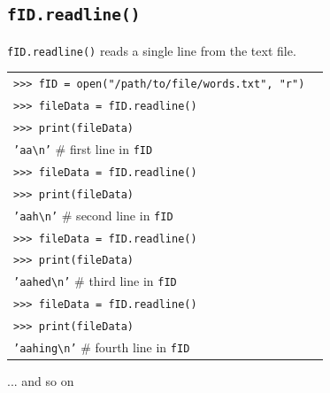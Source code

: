 \documentclass[t,handout,9pt]{beamer}
\begin{document}
\subsection{\texttt{fID.readline()}}
\begin{frame}
\vfill
\texttt{fID.readline()} reads a single line from the text file.
\begin{table}[]
\begin{flushleft}
\begin{tabular}{ll}
\texttt{>{}>{}> fID = open("/path/to/file/words.txt", "r")} &  \\
\texttt{>{}>{}> fileData = fID.readline()} &  \\
\texttt{>{}>{}> print(fileData)} &  \\
\texttt{'aa\textbackslash n'} \hfill \# first line in \texttt{fID} &\\
\texttt{>{}>{}> fileData = fID.readline()} &  \\
\texttt{>{}>{}> print(fileData)} &  \\
\texttt{'aah\textbackslash n'} \hfill \# second line in \texttt{fID} &\\
\texttt{>{}>{}> fileData = fID.readline()} &  \\
\texttt{>{}>{}> print(fileData)} &  \\
\texttt{'aahed\textbackslash n'} \hfill \# third line in \texttt{fID} &\\
\texttt{>{}>{}> fileData = fID.readline()} &  \\
\texttt{>{}>{}> print(fileData)} &  \\
\texttt{'aahing\textbackslash n'} \hfill \# fourth line in \texttt{fID} &\\
\end{tabular}
\end{flushleft}
\end{table}
... and so on
\vfill
\end{frame}
%
\end{document}
